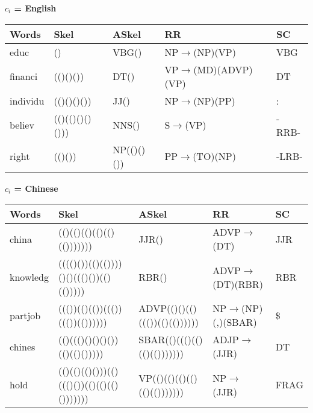 \begin{figure*}[ht]

\begin{center}

    \textbf{$c_i$ = English} \\
    \begin{tabular}{|l|l|l|l|l|}
        \hline
        \textbf{Words} & \textbf{Skel} & \textbf{ASkel} & \textbf{RR }& \textbf{SC }\\
        \hline
        educ     & ()             &  VBG()     &  NP$\rightarrow$(NP)(VP)      &  VBG  \\
        financi  & (()()())       &  DT()      &  VP$\rightarrow$(MD)(ADVP)(VP)&  DT   \\
        individu & (()()()())     &  JJ()      &  NP$\rightarrow$(NP)(PP)      &  :    \\
        believ   & (()(()()()())) &  NNS()     &  S$\rightarrow$(VP)           &  -RRB-\\
        right    & (()())         &  NP(()()())&  PP$\rightarrow$(TO)(NP)      &  -LRB-\\
        \hline
    \end{tabular}
    
    \vspace{.1in}
    
    \textbf{$c_i$ = Chinese} \\
    \begin{tabular}{|l|l|l|l|l|}
        \hline
        \textbf{Words} & \textbf{Skel} & \textbf{ASkel} & \textbf{RR }& \textbf{SC }\\
        \hline
        china &  (()(()(()(()(()(()))))))                  & JJR()
        & ADVP$\rightarrow$(DT)       &  JJR \\
        knowledg &  (((()())(()(())))()()((()())(()(())))) &  RBR()
        &  ADVP$\rightarrow$(DT)(RBR)  &  RBR \\
        partjob &  ((())(()(())((())((())(())))))          &
        ADVP(()()(()((())(()(())))))&  NP$\rightarrow$(NP)(,)(SBAR)& \$   \\
        chines &  (()((()()()()())(()(()()))))             &
        SBAR(()((()(()(()(()))))))  &  ADJP$\rightarrow$(JJR)      &  DT  \\
        hold &  (()(()(()()))(()((()())(()(()(()()))))))   &
        VP(()(()(()(()(()(()))))))  &  NP$\rightarrow$(JJR)        &  FRAG\\
        \hline
    \end{tabular}


\end{center}
\end{figure*}
